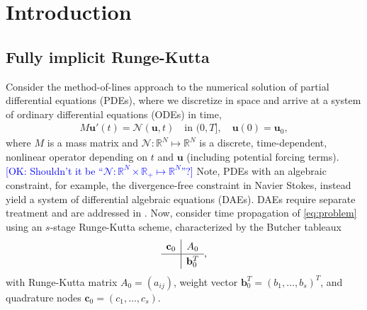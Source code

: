 \documentclass[review]{siamart}
\newcommand{\OK}[1]{\textcolor{blue}{[OK: #1]}}
\begin{document}
\section{Introduction}\label{sec:intro}

\subsection{Fully implicit Runge-Kutta}\label{sec:intro:irk}

Consider the method-of-lines approach to the numerical solution of partial differential
equations (PDEs), where we discretize in space and arrive at a system of ordinary
differential equations (ODEs) in time,
%
\begin{align}\label{eq:problem}
	M\mathbf{u}'(t) =  \mathcal{N}(\mathbf{u},t) \quad\text{in }(0,T], \quad \mathbf{u}(0) = \mathbf{u}_0,
\end{align}
%
where $M$ is a mass matrix and $\mathcal{N}:\mathbb{R}^{N}\mapsto\mathbb{R}^{N}$ is a discrete,
time-dependent, nonlinear operator depending on $t$ and $\mathbf{u}$ (including potential
forcing terms).
%
\OK{Shouldn't it be ``$\mathcal{N}:\mathbb{R}^{N} \times \mathbb{R}_+ \mapsto\mathbb{R}^{N}$''?}
%
Note, PDEs with an algebraic constraint, for example, the divergence-free
constraint in Navier Stokes, instead yield a system of differential algebraic equations
(DAEs). DAEs require separate treatment and are addressed in .
Now, consider time propagation of \eqref{eq:problem} using an $s$-stage
Runge-Kutta scheme, characterized by the Butcher tableaux
%
\begin{align*}
	\renewcommand\arraystretch{1.2}
	\begin{array}
	{c|c}
	\mathbf{c}_0 & A_0\\
	\hline
	& \mathbf{b}_0^T
	\end{array},
\end{align*}
%
with Runge-Kutta matrix $A_0 = (a_{ij})$, weight vector $\mathbf{b}_0^T = (b_1, \ldots, b_s)^T$,
and quadrature nodes $\mathbf{c}_0 = (c_1, \ldots, c_s)$.
\end{document}
